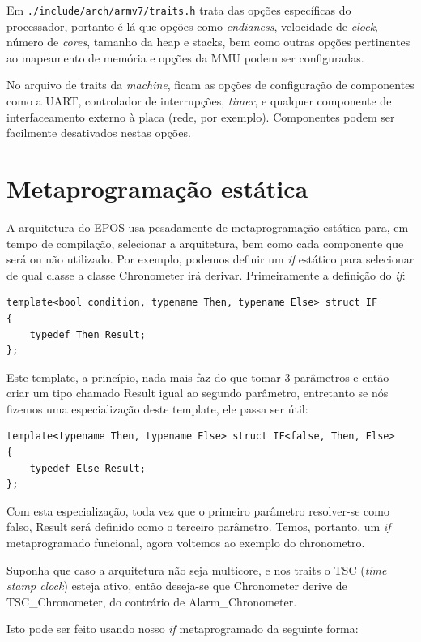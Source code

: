 \documentclass{ufscThesis/ufscThesis} %
\begin{document}
Em \verb+./include/arch/armv7/traits.h+ trata das opções específicas do processador, portanto é lá que opções como \emph{endianess}, velocidade de \emph{clock}, número de \emph{cores}, tamanho da heap e stacks, bem como outras opções pertinentes ao mapeamento de memória e opções da MMU podem ser configuradas.

No arquivo de traits da \emph{machine}, ficam as opções de configuração de componentes como a UART, controlador de interrupções, \emph{timer}, e qualquer componente de interfaceamento externo à placa (rede, por exemplo). Componentes podem ser facilmente desativados nestas opções.

\section{Metaprogramação estática}

A arquitetura do EPOS usa pesadamente de metaprogramação estática para, em tempo de compilação, selecionar a arquitetura, bem como cada componente que será ou não utilizado. Por exemplo, podemos definir um \emph{if} estático para selecionar de qual classe a classe Chronometer irá derivar. Primeiramente a definição do \emph{if}:

\begin{verbatim}
template<bool condition, typename Then, typename Else> struct IF
{
    typedef Then Result;
};
\end{verbatim}

Este template, a princípio, nada mais faz do que tomar 3 parâmetros e então criar um tipo chamado Result igual ao segundo parâmetro, entretanto se nós fizemos uma especialização deste template, ele passa ser útil:

\begin{verbatim}
template<typename Then, typename Else> struct IF<false, Then, Else>
{
    typedef Else Result;
};
\end{verbatim}

Com esta especialização, toda vez que o primeiro parâmetro resolver-se como falso, Result será definido como o terceiro parâmetro. Temos, portanto, um \emph{if} metaprogramado funcional, agora voltemos ao exemplo do chronometro.

Suponha que caso a arquitetura não seja multicore, e nos traits o TSC (\emph{time stamp clock}) esteja ativo, então deseja-se que Chronometer derive de TSC\_Chronometer, do contrário de Alarm\_Chronometer.

Isto pode ser feito usando nosso \emph{if} metaprogramado da seguinte forma:
\end{document}
